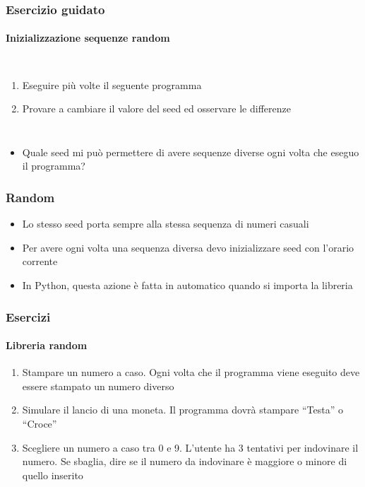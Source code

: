 \begin{exerciseframe}
    \frametitle{Esercizio guidato}
    \framesubtitle{Inizializzazione sequenze random}

    \begin{columns}
        \begin{enumerate}
            \item Eseguire più volte il seguente programma
            \item Provare a cambiare il valore del seed ed osservare le differenze
        \end{enumerate}
        
        \centering
    \end{columns}

    \pause
    \bigskip
    \begin{itemize}
        \item Quale seed mi può permettere di avere sequenze diverse ogni volta che eseguo il programma?
    \end{itemize}
\end{exerciseframe}

\begin{exampleframe}
    \frametitle{Random}

    \begin{itemize}
        \item Lo stesso seed porta sempre alla stessa sequenza di numeri casuali

        \bigskip
        \item Per avere ogni volta una sequenza diversa devo inizializzare seed con l'orario corrente
        \item In Python, questa azione è fatta in automatico quando si importa la libreria
    \end{itemize}
\end{exampleframe}

\begin{exerciseframe}
    \frametitle{Esercizi}
    \framesubtitle{Libreria random}

    \begin{enumerate}
        \item Stampare un numero a caso. Ogni volta che il programma viene eseguito deve essere stampato un numero diverso

        \pause
        \bigskip
        \item Simulare il lancio di una moneta. Il programma dovrà stampare ``Testa'' o ``Croce''

        \pause
        \bigskip
        \item Scegliere un numero a caso tra 0 e 9. L'utente ha 3 tentativi per indovinare il numero. Se sbaglia, dire se il numero da indovinare è maggiore o minore di quello inserito
    \end{enumerate}
\end{exerciseframe}

